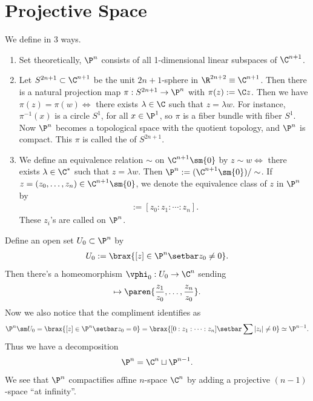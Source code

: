 \documentclass[11pt]{report}
\begin{document}
\section{Projective Space}

\begin{defn}
We define   in 3 ways.
\begin{enumerate}
    \item Set theoretically, $\P^n$ consists of all 1-dimensional linear subspaces of $\C^{n+1}$.
    \item Let $S^{2n+1}\subset \C^{n+1}$ be the unit $2n+1$-sphere in $\R^{2n+2}\equiv \C^{n+1}$. Then there is a natural projection map $\pi : S^{2n+1}\to \P^n$ with $\pi(z):=\C z$. Then we have $\pi(z)=\pi(w) \iff $ there exists $\lambda \in \C$ such that $z=\lambda w$. For instance, $\pi^{-1}(x)$ is a circle $S^1$, for all $x \in \P^1$, so $\pi$ is a fiber bundle with fiber $S^1$. Now $\P^n$ becomes a topological space with the quotient topology, and $\P^n$ is compact. This $\pi$ is called the  of $S^{2n+1}$.
    \item We define an equivalence relation $\sim$ on $\C^{n+1}\sm \{0\}$ by $z \sim w \iff$ there exists $\lambda \in \C^*$ such that $z = \lambda w$.  Then $\P^n := (\C^{n+1}\sm \{0\})/\sim$. If $z=(z_0,\dots,z_n) \in \C^{n+1}\sm \{0\}$, we denote the equivalence class of $z$ in $\P^n$ by \begin{align*}
    [z]:= [z_0:z_1 : \cdots : z_n].
    \end{align*}
    These $z_i$'s are called  on $\P^n$.
\end{enumerate}
\end{defn}

Define an open set $U_0 \subset \P^n$ by
\begin{align*}
U_0 := \brax{[z]\in \P^n \setbar z_0 \ne 0}.
\end{align*}
Then there's a homeomorphism $\vphi_0:U_0 \to \C^n$ sending \begin{align*}
[z]\mapsto \paren{\frac{z_1}{z_0},\dots,\frac{z_n}{z_0}}.
\end{align*}
Now we also notice that the compliment identifies as
\begin{align*}
\P^n \sm U_0 = \brax{[z] \in \P^n \setbar z_0 = 0} = \brax{[0:z_1:\cdots:z_n] \setbar \sum |z_i| \ne 0} \simeq \P^{n-1}.
\end{align*}
Thus we have a decomposition
\begin{align*}
\P^n = \C^n \sqcup \P^{n-1}.
\end{align*}
We see that $\P^n$ compactifies affine $n$-space $\C^n$ by adding a projective $(n-1)$-space ``at infinity''.
\end{document}
